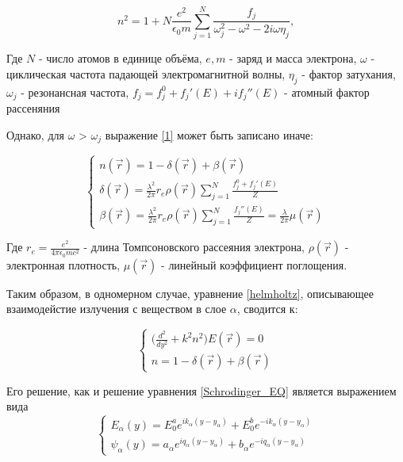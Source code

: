 \documentclass[a4paper]{article}
\begin{document}
\begin{equation}
    n^2 = 1 + N \frac{e^2}{\epsilon_0 m} \sum\limits_{j=1}^{N}\frac{f_j}{\omega_j^2 - \omega^2 -2i\omega \eta_j},
    \label{1}
\end{equation}

Где $N $ - число атомов в единице объёма, $e, m $ - заряд и масса электрона, $ \omega$ - циклическая частота падающей электромагнитной волны, $ \eta_j $ - фактор затухания, $ \omega_j $ - резонансная частота, $f_j = f_j^0 + f_j'(E) + if_j''(E)$ - атомный фактор рассеняния

Однако, для $ \omega$ > $ \omega_j $ выражение \ref{1} может быть записано иначе:

\begin{equation}
    \begin{cases}
        n(\vec{r}) = 1 - \delta(\vec{r}) + \beta(\vec{r}) \\
        \delta(\vec{r}) = \frac{\lambda^2}{2\pi} r_e \rho(\vec{r})\sum\limits_{j=1}^{N}\frac{f_j^0+f_j'(E)}{Z} \\
        \beta(\vec{r}) = \frac{\lambda^2}{2\pi} r_e \rho(\vec{r})\sum\limits_{j=1}^{N}\frac{f_j''(E)}{Z} = \frac{\lambda}{2 \pi} \mu(\vec{r})
    \end{cases}
\end{equation}

Где $ r_e = \frac{e^2}{4\pi \epsilon_0 mc^2}$ - длина Томпсоновского рассеяния электрона, $ \rho(\vec{r})$ - электронная плотность, $ \mu(\vec{r})$ - линейный коэффициент поглощения. 

Таким образом, в одномерном случае, уравнение \ref{helmholtz}, описывающее взаимодейстие излучения с веществом в слое $\alpha $, сводится к:

\begin{equation}
    \begin{cases}
        \Bigg( \frac{d^2}{dy^2} + k^2 n^2 \Bigg) E(\vec{r}) = 0 \\
    n = 1 - \delta(\vec{r}) + \beta(\vec{r})
    \end{cases}
\end{equation}

Его решение, как и решение уравнения \ref{Schrodinger_EQ} является выражением вида 
\begin{equation}
    \begin{cases}
     E_\alpha(y) = E_0^a e^{ik_\alpha (y-y_\alpha)} + E_0^b e^{-ik_\alpha (y-y_\alpha)} \\
     \psi_{\alpha}(y) = a_{\alpha}e^{iq_{\alpha}(y- y_{\alpha})} + b_{\alpha}e^{-iq_{\alpha}(y- y_{\alpha})}
    \end{cases}
\end{equation}
\end{document}
